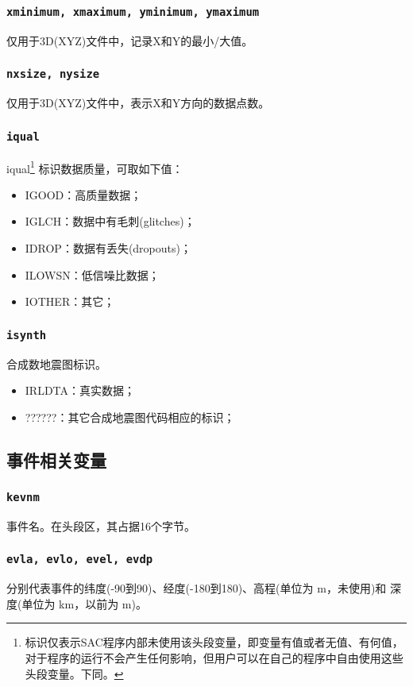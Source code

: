 \subsubsection{\texttt{xminimum, xmaximum, yminimum, ymaximum}}
仅用于3D(XYZ)文件中，记录X和Y的最小/大值。

\subsubsection{\texttt{nxsize, nysize}}
仅用于3D(XYZ)文件中，表示X和Y方向的数据点数。

\subsubsection{\texttt{iqual}\dag}
iqual\footnote{\dag 标识仅表示SAC程序内部未使用该头段变量，即变量有值或者无值、有何值，
对于程序的运行不会产生任何影响，但用户可以在自己的程序中自由使用这些头段变量。下同。
}
标识数据质量，可取如下值：
\begin{itemize}
\ttfamily
\item IGOOD：高质量数据；
\item IGLCH：数据中有毛刺(glitches)；
\item IDROP：数据有丢失(dropouts)；
\item ILOWSN：低信噪比数据；
\item IOTHER：其它；
\end{itemize}

\subsubsection{\texttt{isynth}\dag}
合成数地震图标识。
\begin{itemize}
\ttfamily
\item IRLDTA：真实数据；
\item ??????：其它合成地震图代码相应的标识；
\end{itemize}

\subsection{事件相关变量}
\subsubsection{\texttt{kevnm}}
事件名。在头段区，其占据16个字节。

\subsubsection{\texttt{evla, evlo, evel, evdp}}
分别代表事件的纬度(-90到90)、经度(-180到180)、高程(单位为 \si{\m}，未使用)和
深度(单位为 \si{\km}，以前为 \si{\m})。

